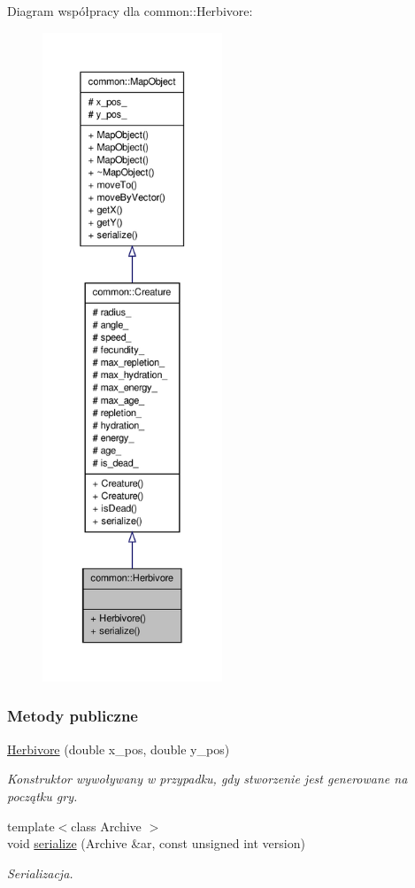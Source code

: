 Diagram współpracy dla common\-:\-:Herbivore\-:
\nopagebreak
\begin{figure}[H]
\begin{center}
\leavevmode
\includegraphics[height=550pt]{classcommon_1_1Herbivore__coll__graph}
\end{center}
\end{figure}
\subsubsection*{Metody publiczne}
\begin{DoxyCompactItemize}
\item 
\hyperlink{classcommon_1_1Herbivore_afd574119349d162e90030ec101c5d6f9}{Herbivore} (double x\-\_\-pos, double y\-\_\-pos)
\begin{DoxyCompactList}\small\item\em Konstruktor wywoływany w przypadku, gdy stworzenie jest generowane na początku gry. \end{DoxyCompactList}\item 
{\footnotesize template$<$class Archive $>$ }\\void \hyperlink{classcommon_1_1Herbivore_affb4a1d96e6f92d41223d2f5eb2d6f03}{serialize} (Archive \&ar, const unsigned int version)
\begin{DoxyCompactList}\small\item\em Serializacja. \end{DoxyCompactList}\end{DoxyCompactItemize}
